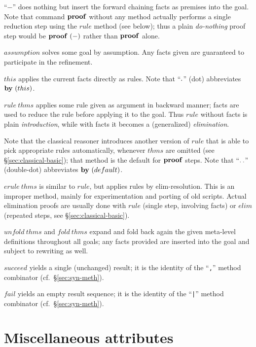 \begin{descr}
\item [``$-$''] does nothing but insert the forward chaining facts as premises
  into the goal.  Note that command ${\mathord{\mathbf{proof}}}$ without any method actually
  performs a single reduction step using the $rule$ method (see below); thus a
  plain \emph{do-nothing} proof step would be $\PROOF{-}$ rather than
  ${\mathord{\mathbf{proof}}}$ alone.
\item [$assumption$] solves some goal by assumption.  Any facts given are
  guaranteed to participate in the refinement.
\item [$this$] applies the current facts directly as rules.  Note that
  ``${\mathord{\mathbf{.}}}$'' (dot) abbreviates $\BY{this}$.
\item [$rule~thms$] applies some rule given as argument in backward manner;
  facts are used to reduce the rule before applying it to the goal.  Thus
  $rule$ without facts is plain \emph{introduction}, while with facts it
  becomes a (generalized) \emph{elimination}.
  
  Note that the classical reasoner introduces another version of $rule$ that
  is able to pick appropriate rules automatically, whenever $thms$ are omitted
  (see \S\ref{sec:classical-basic}); that method is the default for
  ${\mathord{\mathbf{proof}}}$ steps.  Note that ``${\mathord{\mathbf{.\,.}}}$'' (double-dot) abbreviates
  $\BY{default}$.
\item [$erule~thms$] is similar to $rule$, but applies rules by
  elim-resolution.  This is an improper method, mainly for experimentation and
  porting of old scripts.  Actual elimination proofs are usually done with
  $rule$ (single step, involving facts) or $elim$ (repeated steps, see
  \S\ref{sec:classical-basic}).
\item [$unfold~thms$ and $fold~thms$] expand and fold back again the given
  meta-level definitions throughout all goals; any facts provided are inserted
  into the goal and subject to rewriting as well.
\item [$succeed$] yields a single (unchanged) result; it is the identity of
  the ``\texttt{,}'' method combinator (cf.\ \S\ref{sec:syn-meth}).
\item [$fail$] yields an empty result sequence; it is the identity of the
  ``\texttt{|}'' method combinator (cf.\ \S\ref{sec:syn-meth}).
\end{descr}


\section{Miscellaneous attributes}

